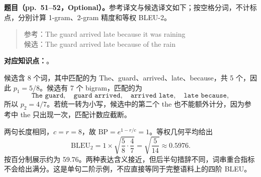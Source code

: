 \nopagebreak[4]
\textbf{题目（pp.~51--52，Optional）。}参考译文与候选译文如下；按空格分词，不计标点，分别计算 1-gram、2-gram 精度和等权 BLEU-2。
\begin{quote}\small
参考：The guard arrived late because it was raining\\
候选：The guard arrived late because of the rain
\end{quote}
\textbf{对应知识点：}。

\begin{workedsolution}
候选含 8 个词，其中匹配的为 The、guard、arrived、late、because，共 5 个，因此 $p_1=5/8$。候选有 7 个 bigram，匹配的为
\[
 \texttt{The guard},\quad\texttt{guard arrived},\quad
 \texttt{arrived late},\quad\texttt{late because},
\]
所以 $p_2=4/7$。若统一转为小写，候选中的第二个 the 也不能额外计分，因为参考中 the 只出现一次，匹配计数应截断。

两句长度相同，$c=r=8$，故 $\mathrm{BP}=e^{1-r/c}=1$。等权几何平均给出
\[
 \boxed{\mathrm{BLEU}_2
 =1\times\sqrt{\frac58\cdot\frac47}
 =\sqrt{\frac5{14}}\approx0.5976.}
\]
按百分制展示约为 59.76。两种表达含义接近，但后半句措辞不同，词串重合指标不会给出满分。这是单句二阶示例，不应直接等同于完整语料上的四阶 BLEU。
\end{workedsolution}
\endgroup
